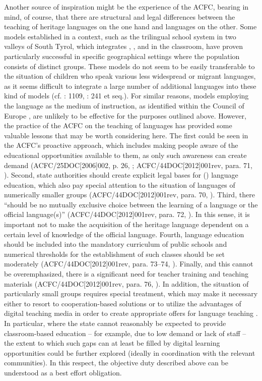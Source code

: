 \documentclass[output=paper,colorlinks,citecolor=brown]{langscibook}
\begin{document}
Another source of inspiration might be the experience of the ACFC, bearing in mind, of course, that there are structural and legal differences between the teaching of heritage languages on the one hand and  languages on the other. Some models established in a  context, such as the trilingual school system in two  valleys of South Tyrol, which integrates , , and  in the classroom, have proven particularly successful in specific geographical settings where the population consists of distinct  groups. These models do not seem to be easily transferable to the situation of children who speak various less widespread or migrant languages, as it seems difficult to integrate a large number of additional languages into these kind of models  (cf. \citealt{carla2018}: 1109, \citealt{vettori2021}: 241 et seq.). For similar reasons, models employing the  language as the medium of instruction, as identified within the Council of Europe \citep{prina_dunbar_gurbo2020}, are unlikely to be effective for the purposes outlined above. However, the practice of the ACFC on the teaching of  languages has provided some valuable lessons that may be worth considering here. The first could be seen in the ACFC's proactive approach, which includes making people aware of the educational opportunities available to them, as only such awareness can create demand (ACFC/25DOC[2006]002, p. 26, \citealt{acfc2006}; ACFC/44DOC[2012]001rev, para. 71, \citealt{acfc2012}). Second, state authorities should create explicit legal bases for () language education, which also pay special attention to the situation of languages of numerically smaller groups (ACFC/44DOC[2012]001rev, para. 70, \citealt{acfc2012}). Third, there ``should be no mutually exclusive choice between the learning of a  language or the official language(s)'' (ACFC/44DOC[2012]001rev, para. 72, \citealt{acfc2012}). In this sense, it is important not to make the acquisition of the heritage language dependent on a certain level of knowledge of the official language. Fourth,  language education should be included into the mandatory curriculum of public schools and numerical thresholds for the establishment of such classes should be set moderately (ACFC/44DOC[2012]001rev, para. 73--74, \citealt{acfc2012}). Finally, and this cannot be overemphasized, there is a significant need for teacher training and teaching materials (ACFC/44DOC[2012]001rev, para. 76, \citealt{acfc2012}). In addition, the situation of particularly small  groups requires special treatment, which may make it necessary either to resort to cooperation-based solutions or to utilize the advantages of digital teaching media in order to create appropriate offers for language teaching \citep[40]{hofmann2023a}. In particular, where the state cannot reasonably be expected to provide classroom-based education -- for example, due to low demand or lack of staff -- the extent to which such gaps can at least be filled by digital learning opportunities could be further explored (ideally in coordination with the relevant communities). In this respect, the objective duty described above can be understood as a best effort obligation.
\end{document}
